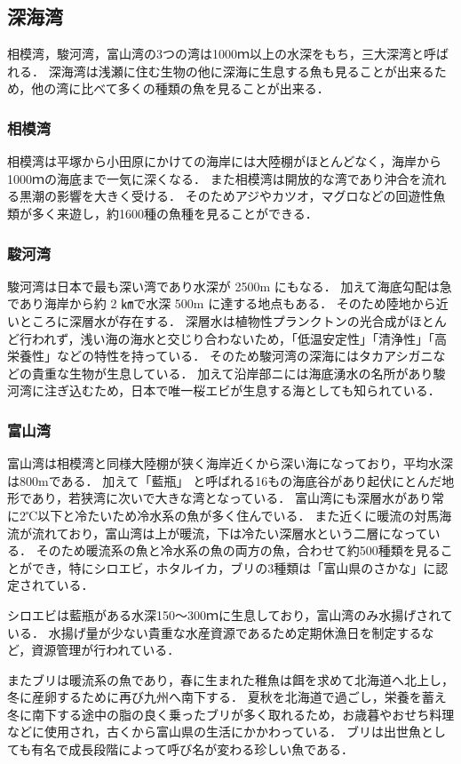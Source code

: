 \documentclass[12pt,a4j,titlepage]{ltjsarticle}
\begin{document}
\subsection{深海湾}
相模湾，駿河湾，富山湾の3つの湾は1000ｍ以上の水深をもち，三大深湾と呼ばれる．
深海湾は浅瀬に住む生物の他に深海に生息する魚も見ることが出来るため，他の湾に比べて多くの種類の魚を見ることが出来る．
\subsubsection{相模湾}
相模湾は平塚から小田原にかけての海岸には大陸棚がほとんどなく，海岸から1000ｍの海底まで一気に深くなる．
また相模湾は開放的な湾であり沖合を流れる黒潮の影響を大きく受ける．
そのためアジやカツオ，マグロなどの回遊性魚類が多く来遊し，約1600種の魚種を見ることができる\cite{sagami}．
\subsubsection{駿河湾}
駿河湾は日本で最も深い湾であり水深が 2500m にもなる\cite{suruga}．
加えて海底勾配は急であり海岸から約 2 ㎞で水深 500m に達する地点もある．
そのため陸地から近いところに深層水が存在する．
深層水は植物性プランクトンの光合成がほとんど行われず，浅い海の海水と交じり合わないため，「低温安定性」「清浄性」「高栄養性」などの特性を持っている．
そのため駿河湾の深海にはタカアシガニなどの貴重な生物が生息している．
加えて沿岸部ニには海底湧水の名所があり駿河湾に注ぎ込むため，日本で唯一桜エビが生息する海としても知られている．
\subsubsection{富山湾}
富山湾は相模湾と同様大陸棚が狭く海岸近くから深い海になっており，平均水深は800mである\cite{toyama}．
加えて「藍瓶」 と呼ばれる16もの海底谷があり起伏にとんだ地形であり，若狭湾に次いで大きな湾となっている．
富山湾にも深層水があり常に2℃以下と冷たいため冷水系の魚が多く住んでいる．
また近くに暖流の対馬海流が流れており，富山湾は上が暖流，下は冷たい深層水という二層になっている．
そのため暖流系の魚と冷水系の魚の両方の魚，合わせて約500種類を見ることができ，特にシロエビ，ホタルイカ，ブリの3種類は「富山県のさかな」に認定されている．\par
シロエビは藍瓶がある水深150～300ｍに生息しており，富山湾のみ水揚げされている．
水揚げ量が少ない貴重な水産資源であるため定期休漁日を制定するなど，資源管理が行われている．\par
またブリは暖流系の魚であり，春に生まれた稚魚は餌を求めて北海道へ北上し，冬に産卵するために再び九州へ南下する．
夏秋を北海道で過ごし，栄養を蓄え冬に南下する途中の脂の良く乗ったブリが多く取れるため，お歳暮やおせち料理などに使用され，古くから富山県の生活にかかわっている．
ブリは出世魚としても有名で成長段階によって呼び名が変わる珍しい魚である．
\end{document}

